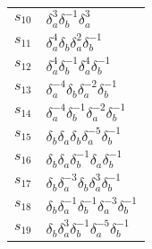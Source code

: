 \documentclass{article}
\begin{document}
\begin{center}
\begin{tabular}{ll}
$s_{10}$ & $\delta_a^{3}\delta_b^{-1}\delta_a^{3}$ \\
$s_{11}$ & $\delta_a^{4}\delta_b^{}\delta_a^{2}\delta_b^{-1}$ \\
$s_{12}$ & $\delta_a^{4}\delta_b^{-1}\delta_a^{4}\delta_b^{-1}$ \\
$s_{13}$ & $\delta_a^{-4}\delta_b^{}\delta_a^{-2}\delta_b^{-1}$ \\
$s_{14}$ & $\delta_a^{-4}\delta_b^{-1}\delta_a^{-2}\delta_b^{-1}$ \\
$s_{15}$ & $\delta_b^{}\delta_a^{}\delta_b^{}\delta_a^{-5}\delta_b^{-1}$ \\
$s_{16}$ & $\delta_b^{}\delta_a^{}\delta_b^{-1}\delta_a^{}\delta_b^{-1}$ \\
$s_{17}$ & $\delta_b^{}\delta_a^{-3}\delta_b^{}\delta_a^{3}\delta_b^{-1}$ \\
$s_{18}$ & $\delta_b^{}\delta_a^{-1}\delta_b^{-1}\delta_a^{-3}\delta_b^{-1}$ \\
$s_{19}$ & $\delta_b^{}\delta_a^{3}\delta_b^{-1}\delta_a^{-5}\delta_b^{-1}$ \\
\bottomrule
\end{tabular}
\end{center}

\thispagestyle{empty}
\end{document}
